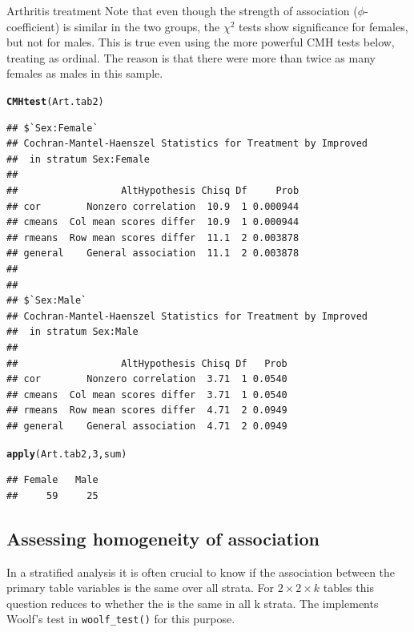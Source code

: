 \documentclass[11pt]{book}\usepackage[]{graphicx}\usepackage[]{color}
\makeatletter
\newcommand{\hlnum}[1]{\textcolor[rgb]{0.686,0.059,0.569}{#1}}%
\newcommand{\hlstd}[1]{\textcolor[rgb]{0.345,0.345,0.345}{#1}}%
\newcommand{\hlkwd}[1]{\textcolor[rgb]{0.737,0.353,0.396}{\textbf{#1}}}%
\newenvironment{kframe}{%
 \def\at@end@of@kframe{}%
 \ifinner\ifhmode%
  \def\at@end@of@kframe{\end{minipage}}%
  \begin{minipage}{\columnwidth}%
 \fi\fi%
 \def\FrameCommand##1{\hskip\@totalleftmargin \hskip-\fboxsep
 \colorbox{shadecolor}{##1}\hskip-\fboxsep
     \hskip-\linewidth \hskip-\@totalleftmargin \hskip\columnwidth}%
 \MakeFramed {\advance\hsize-\width
   \@totalleftmargin\z@ \linewidth\hsize
   \@setminipage}}%
 {\par\unskip\endMakeFramed%
 \at@end@of@kframe}
\newenvironment{knitrout}{}{} %
\renewenvironment{knitrout}{\small\renewcommand{\baselinestretch}{.85}}{} %
\makeatother
\begin{document}
\begin{Example}[arthrit3]{Arthritis treatment}
Note that even though the strength of association ($\phi$-coefficient)
is similar in the two groups, the $\chi^2$ tests show
significance for females, but not for males.
This is true even using the more powerful CMH tests below, treating
 as ordinal.  The reason is that there were more than
twice as many females as males in this sample.
\begin{knitrout}
\color{fgcolor}\begin{kframe}
\begin{alltt}
\hlkwd{CMHtest}\hlstd{(Art.tab2)}
\end{alltt}
\begin{verbatim}
## $`Sex:Female`
## Cochran-Mantel-Haenszel Statistics for Treatment by Improved 
## 	in stratum Sex:Female 
## 
##                  AltHypothesis Chisq Df     Prob
## cor        Nonzero correlation  10.9  1 0.000944
## cmeans  Col mean scores differ  10.9  1 0.000944
## rmeans  Row mean scores differ  11.1  2 0.003878
## general    General association  11.1  2 0.003878
## 
## 
## $`Sex:Male`
## Cochran-Mantel-Haenszel Statistics for Treatment by Improved 
## 	in stratum Sex:Male 
## 
##                  AltHypothesis Chisq Df   Prob
## cor        Nonzero correlation  3.71  1 0.0540
## cmeans  Col mean scores differ  3.71  1 0.0540
## rmeans  Row mean scores differ  4.71  2 0.0949
## general    General association  4.71  2 0.0949
\end{verbatim}
\begin{alltt}
\hlkwd{apply}\hlstd{(Art.tab2,} \hlnum{3}\hlstd{, sum)}
\end{alltt}
\begin{verbatim}
## Female   Male 
##     59     25
\end{verbatim}
\end{kframe}
\end{knitrout}


\end{Example}

\subsection{Assessing homogeneity of association}\label{sec:twoway-homog}
In a stratified analysis
it is often  crucial to know if the association between the
primary table variables is the same over all strata.  For 
\(2 \times  2 \times k\) tables this question reduces to whether the  is
the same in all k strata. The  implements 
Woolf's test \citep{Woolf:1995} in \verb|woolf_test()|
for this purpose.
\end{document}
